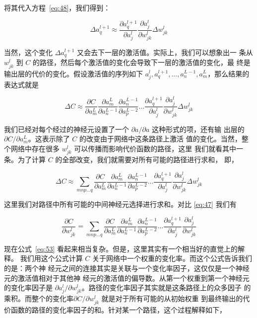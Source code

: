 将其代入方程~\eqref{eq:48}，我们得到：

\begin{equation}
  \Delta a^{l+1}_q \approx \frac{\partial a^{l+1}_q}{\partial a^l_j}
  \frac{\partial a^l_j}{\partial w^l_{jk}} \Delta w^l_{jk}
  \label{eq:50}\tag{50}
\end{equation}

当然，这个变化 $\Delta a^{l+1}_q$ 又会去下一层的激活值。实际上，我们可以想象出一
条从 $w_{jk}^l$ 到 $C$ 的路径，然后每个激活值的变化会导致下一层的激活值的变化，最
终是输出层的代价的变化。假设激活值的序列如下 $a_j^l, a_q^{l+1},
...,a_n^{L-1},a_m^{L}$，那么结果的表达式就是

\begin{equation}
  \Delta C \approx \frac{\partial C}{\partial a^L_m} 
  \frac{\partial a^L_m}{\partial a^{L-1}_n}
  \frac{\partial a^{L-1}_n}{\partial a^{L-2}_p} \ldots
  \frac{\partial a^{l+1}_q}{\partial a^l_j}
  \frac{\partial a^l_j}{\partial w^l_{jk}} \Delta w^l_{jk}
  \label{eq:51}\tag{51}
\end{equation}

我们已经对每个经过的神经元设置了一个 $\partial a/\partial a$ 这种形式的项，还有输
出层的 $\partial C/\partial a_m^L$。这表示除了 $C$ 的改变由于网络中这条路径上激活
值的变化。当然，整个网络中存在很多 $w_{jk}^l$ 可以传播而影响代价函数的路径，这里
我们就看其中一条。为了计算 $C$ 的全部改变，我们就需要对所有可能的路径进行求和，
即，

\begin{equation} 
  \Delta C \approx \sum_{mnp\ldots q} \frac{\partial C}{\partial a^L_m}
  \frac{\partial a^L_m}{\partial a^{L-1}_n} \frac{\partial a^{L-1}_n}{\partial
    a^{L-2}_p} \ldots \frac{\partial a^{l+1}_q}{\partial a^l_j} \frac{\partial
    a^l_j}{\partial w^l_{jk}} \Delta w^l_{jk}
  \label{eq:52}\tag{52}
\end{equation}

这里我们对路径中所有可能的中间神经元选择进行求和。对比 \eqref{eq:47} 我们有

\begin{equation} 
  \frac{\partial C}{\partial w^l_{jk}} = \sum_{mnp\ldots q} \frac{\partial
    C}{\partial a^L_m} \frac{\partial a^L_m}{\partial a^{L-1}_n} \frac{\partial
    a^{L-1}_n}{\partial a^{L-2}_p} \ldots \frac{\partial a^{l+1}_q}{\partial
    a^l_j} \frac{\partial a^l_j}{\partial w^l_{jk}}
\label{eq:53}\tag{53}
\end{equation}

现在公式~\eqref{eq:53} 看起来相当复杂。但是，这里其实有一个相当好的直觉上的解释。
我们用这个公式计算 $C$ 关于网络中一个权重的变化率。而这个公式告诉我们的是：两个神
经元之间的连接其实是关联与一个变化率因子，这仅仅是一个神经元的激活值相对于其他神
经元的激活值的偏导数。从第一个权重到第一个神经元的变化率因子是
$\partial a_j^l/\partial w_{jk}^l$。路径的变化率因子其实就是这条路径上的众多因子
的乘积。而整个的变化率$\partial C/\partial w_{jk}^l$ 就是对于所有可能的从初始权重
到最终输出的代价函数的路径的变化率因子的和。针对某一个路径，这个过程解释如下，

